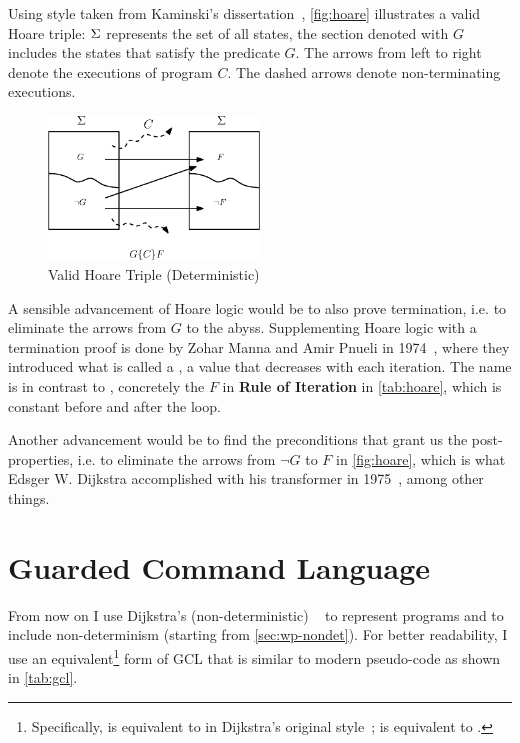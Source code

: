 Using style taken from Kaminski's dissertation~\cite{kaminski19}, \autoref{fig:hoare} illustrates a valid Hoare triple: $\S$ represents the set of all states, the section denoted with $G$ includes the states that satisfy the predicate $G$. 
The arrows from left to right denote the executions of program $C$. 
The dashed arrows denote non-terminating executions. 

\begin{figure}[ht!]\centering
\includegraphics[width=0.5\textwidth]{image/hoare.eps}
\caption{Valid Hoare Triple (Deterministic)}
\label{fig:hoare}
\end{figure}


A sensible advancement of Hoare logic would be to also prove termination, i.e. to eliminate the arrows from $G$ to the abyss.  
Supplementing Hoare logic with a termination proof is done by Zohar Manna and Amir Pnueli in 1974~\cite{manna74}, where they introduced what is called a , a value that decreases with each iteration. The name is in contrast to , concretely the $F$ in \textbf{Rule of Iteration} in \autoref{tab:hoare}, which is constant before and after the loop. 

Another advancement would be to find the  preconditions that grant us the post-properties, i.e. to eliminate the arrows from $\neg G$ to $F$ in \autoref{fig:hoare}, which  is what Edsger W. Dijkstra accomplished with his  transformer in 1975~\cite{dijkstra75}, among other things. 


\section{Guarded Command Language}\label{sec:gcl}
From now on I use Dijkstra's (non-deterministic) ~\cite{dijkstra75} to represent programs and to include non-determinism (starting from \autoref{sec:wp-nondet}).
For better readability, I use an equivalent\footnote{Specifically,   is equivalent to
 in Dijkstra's original style~\cite{dijkstra75};  is equivalent to .} 
form of GCL that is similar to modern pseudo-code as shown in \autoref{tab:gcl}. 


